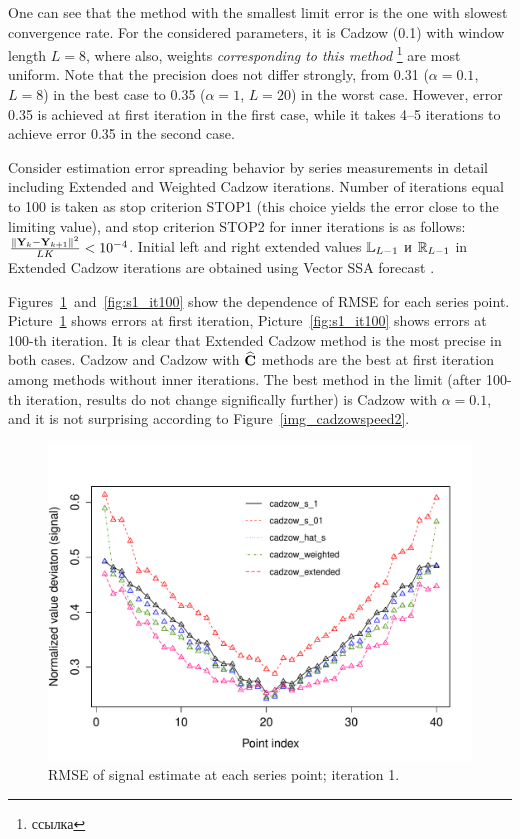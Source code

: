 \documentclass[12pt,a4paper,fleqn,leqno]{article}
\begin{document}
One can see that the method with the smallest limit error is the one with slowest convergence rate. For the considered parameters, it is Cadzow (0.1) with window length $L=8$, where also, weights \emph{corresponding to this method} \footnote{ссылка} are most uniform.
Note that the precision does not differ strongly, from 0.31 ($\alpha=0.1$, $L=8$) in the best case to 0.35 ($\alpha=1$, $L=20$) in the worst case. However, error 0.35 is achieved at first iteration in the first case, while it takes 4--5 iterations to achieve error 0.35 in the second case.

Consider estimation error spreading behavior by series measurements in detail including Extended and Weighted Cadzow iterations. Number of iterations equal to 100 is taken as stop criterion STOP1 (this choice yields the error close to the limiting value), and stop criterion STOP2 for inner iterations is as follows:
 $\frac{\|\mathbf{Y}_k - \mathbf{Y}_{k+1}\|^2}{LK} < 10^{-4}$. Initial left and right extended values $\mathbb{L}_{L-1}$ и $\mathbb{R}_{L-1}$ in Extended Cadzow iterations are obtained using Vector SSA forecast \cite[chapter 2.3.1]{Golyandina.etal2001}.

Figures~\ref{fig:s1_it1}~and~\ref{fig:s1_it100} show the dependence of RMSE for each series point. Picture~\ref{fig:s1_it1} shows errors at first iteration, Picture~\ref{fig:s1_it100} shows errors at 100-th iteration. It is clear that Extended Cadzow method is the most precise in both cases. Cadzow and Cadzow with $\widehat{\mathbf{C}}$ methods are the best at first iteration among methods without inner iterations. The best method in the limit (after 100-th iteration, results do not change significally further) is Cadzow with $\alpha=0.1$, and it is not surprising according to Figure~\ref{img_cadzowspeed2}.

\begin{figure}[!hhh]
\begin{center}
\includegraphics[width = 13cm]{s1_it1.pdf}
\caption{RMSE of signal estimate at each series point; iteration 1.}
\label{fig:s1_it1}
\end{center}
\end{figure}
\end{document}
